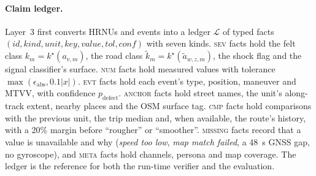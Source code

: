 \paragraph{Claim ledger.}
Layer~3 first converts HRNUs and events into a ledger $\mathcal L$ of typed facts $(\mathit{id},\mathit{kind},\mathit{unit},\mathit{key},\mathit{value},\mathit{tol},\mathit{conf})$ with seven kinds.
\textsc{sev} facts hold the felt class $k_m=k^\star(a_{v,m})$, the road class $\tilde k_m=k^\star(\tilde a_{w,z,m})$, the shock flag and the signal classifier's surface.
\textsc{num} facts hold measured values with tolerance $\max(\epsilon_{\mathrm{abs}},0.1|x|)$.
\textsc{evt} facts hold each event's type, position, maneuver and MTVV, with confidence $p_{\mathrm{defect}}$.
\textsc{anchor} facts hold street names, the unit's along-track extent, nearby places and the OSM surface tag.
\textsc{cmp} facts hold comparisons with the previous unit, the trip median and, when available, the route's history, with a 20\% margin before ``rougher'' or ``smoother''.
\textsc{missing} facts record that a value is unavailable and why (\emph{speed too low}, \emph{map match failed}, a 48~s GNSS gap, no gyroscope), and \textsc{meta} facts hold channels, persona and map coverage.
The ledger is the reference for both the run-time verifier and the evaluation.

